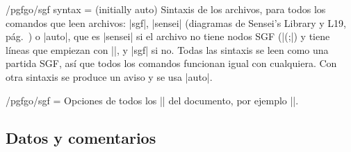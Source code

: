 \begin{key}{/pgfgo/sgf syntax =  (initially auto)}
	Sintaxis de los archivos, para todos los comandos que leen archivos: |sgf|, |sensei| (diagramas de Sensei's Library y L19, pág.~\pageref{subsec:sgfsensei}) o |auto|, que es |sensei| si el archivo no tiene nodos SGF (|(;|) y tiene líneas que empiezan con |$$|, y |sgf| si no. Todas las sintaxis se leen como una partida SGF, así que todos los comandos funcionan igual con cualquiera. Con otra sintaxis se produce un aviso y se usa |auto|.
\end{key}

\begin{key}{/pgfgo/sgf = }
	Opciones de todos los |\sgf| del documento, por ejemplo ||.
\end{key}

\subsection{Datos y comentarios}
\label{subsec:sgfdatos}


